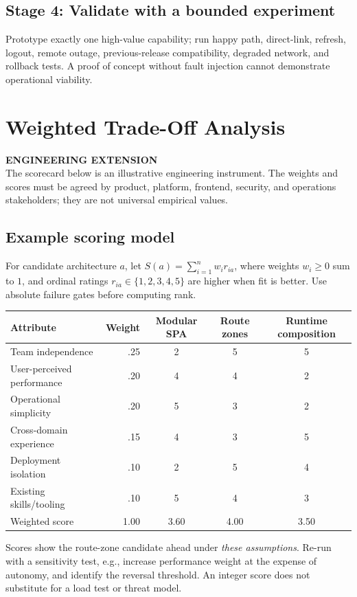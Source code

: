 \documentclass[11pt,letterpaper,oneside]{report}
\newcommand{\added}[1]{\begin{engineerbox}\textbf{ENGINEERING EXTENSION}\\#1\end{engineerbox}}
\begin{document}
\section{Stage 4: Validate with a bounded experiment}
Prototype exactly one high-value capability; run happy path, direct-link, refresh, logout, remote outage, previous-release compatibility, degraded network, and rollback tests. A proof of concept without fault injection cannot demonstrate operational viability.
\chapter{Weighted Trade-Off Analysis}
\added{The scorecard below is an illustrative engineering instrument. The weights and scores must be agreed by product, platform, frontend, security, and operations stakeholders; they are not universal empirical values.}
\section{Example scoring model}
For candidate architecture $a$, let $S(a)=\sum_{i=1}^{n}w_i r_{ia}$, where weights $w_i\geq0$ sum to $1$, and ordinal ratings $r_{ia}\in\{1,2,3,4,5\}$ are higher when fit is better. Use absolute failure gates before computing rank.
\begin{center}\small\begin{tabular}{p{.32\linewidth}rccc}\toprule Attribute & Weight & Modular SPA & Route zones & Runtime composition\\\midrule
Team independence & .25 & 2 & 5 & 5\\
User-perceived performance & .20 & 4 & 4 & 2\\
Operational simplicity & .20 & 5 & 3 & 2\\
Cross-domain experience & .15 & 4 & 3 & 5\\
Deployment isolation & .10 & 2 & 5 & 4\\
Existing skills/tooling & .10 & 5 & 4 & 3\\\midrule
Weighted score & 1.00 & 3.60 & 4.00 & 3.50\\\bottomrule\end{tabular}\end{center}
Scores show the route-zone candidate ahead under \emph{these assumptions}. Re-run with a sensitivity test, e.g., increase performance weight at the expense of autonomy, and identify the reversal threshold. An integer score does not substitute for a load test or threat model.
\end{document}
